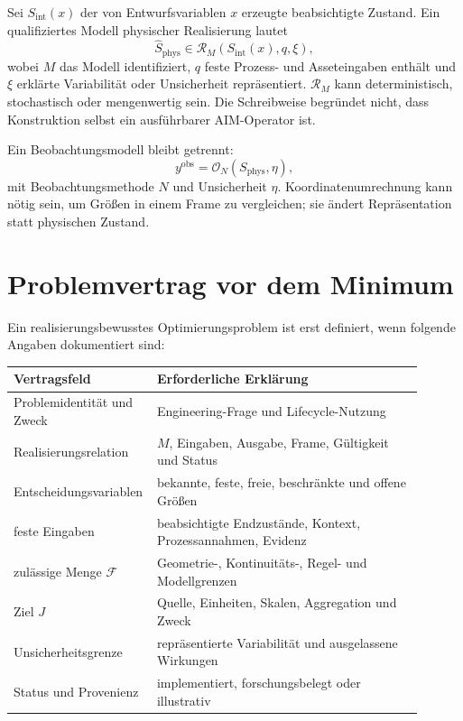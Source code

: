Sei \(S_{\mathrm{int}}(x)\) der von Entwurfsvariablen \(x\) erzeugte
beabsichtigte Zustand. Ein qualifiziertes Modell physischer Realisierung lautet
\[
\widehat S_{\mathrm{phys}}
\in
\mathcal R_M\!\left(
S_{\mathrm{int}}(x),q,\xi
\right),
\]
wobei \(M\) das Modell identifiziert, \(q\) feste Prozess- und Asseteingaben
enthält und \(\xi\) erklärte Variabilität oder Unsicherheit repräsentiert.
\(\mathcal R_M\) kann deterministisch, stochastisch oder mengenwertig sein.
Die Schreibweise begründet nicht, dass Konstruktion selbst ein ausführbarer
AIM-Operator ist.

Ein Beobachtungsmodell bleibt getrennt:
\[
y^{\mathrm{obs}}
=
\mathcal O_N(S_{\mathrm{phys}},\eta),
\]
mit Beobachtungsmethode \(N\) und Unsicherheit \(\eta\).
Koordinatenumrechnung kann nötig sein, um Größen in einem Frame zu vergleichen;
sie ändert Repräsentation statt physischen Zustand.

\section{Problemvertrag vor dem Minimum}

Ein realisierungsbewusstes Optimierungsproblem ist erst definiert, wenn
folgende Angaben dokumentiert sind:

\begin{center}
\small
\begin{tabular}{p{0.26\linewidth}p{0.64\linewidth}}
\toprule
Vertragsfeld & Erforderliche Erklärung\\
\midrule
Problemidentität und Zweck & Engineering-Frage und Lifecycle-Nutzung\\
Realisierungsrelation & \(M\), Eingaben, Ausgabe, Frame, Gültigkeit und Status\\
Entscheidungsvariablen & bekannte, feste, freie, beschränkte und offene Größen\\
feste Eingaben & beabsichtigte Endzustände, Kontext, Prozessannahmen, Evidenz\\
zulässige Menge \(\mathcal F\) & Geometrie-, Kontinuitäts-, Regel- und Modellgrenzen\\
Ziel \(J\) & Quelle, Einheiten, Skalen, Aggregation und Zweck\\
Unsicherheitsgrenze & repräsentierte Variabilität und ausgelassene Wirkungen\\
Status und Provenienz & implementiert, forschungsbelegt oder illustrativ\\
\bottomrule
\end{tabular}
\end{center}


